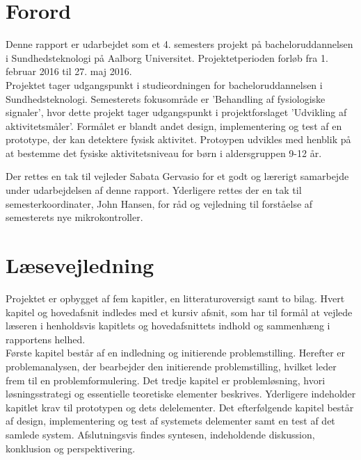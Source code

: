 \section*{Forord}
Denne rapport er udarbejdet som et 4. semesters projekt på bacheloruddannelsen i Sundhedsteknologi på Aalborg Universitet. Projektetperioden forløb fra 1. februar 2016 til 27. maj 2016. \\
Projektet tager udgangspunkt i studieordningen for bacheloruddannelsen i Sundhedsteknologi. Semesterets fokusområde er 'Behandling af fysiologiske signaler', hvor dette projekt tager udgangspunkt i projektforslaget 'Udvikling af aktivitetsmåler'. Formålet er blandt andet design, implementering og test af en prototype, der kan detektere fysisk aktivitet. Protoypen udvikles med henblik på at bestemme det fysiske aktivitetsniveau for børn i aldersgruppen 9-12 år. %

Der rettes en tak til vejleder Sabata Gervasio for et godt og lærerigt samarbejde under udarbejdelsen af denne rapport. Yderligere rettes der en tak til semesterkoordinater, John Hansen, for råd og vejledning til forståelse af semesterets nye mikrokontroller. 

\section*{Læsevejledning}
Projektet er opbygget af fem kapitler, en litteraturoversigt samt to bilag. Hvert kapitel og hovedafsnit indledes med et kursiv afsnit, som har til formål at vejlede læseren i henholdsvis kapitlets og hovedafsnittets indhold og sammenhæng i rapportens helhed.\\
Første kapitel består af en indledning og initierende problemstilling. Herefter er problemanalysen, der bearbejder den initierende problemstilling, hvilket leder frem til en problemformulering. Det tredje kapitel er problemløsning, hvori løsningsstrategi og essentielle teoretiske elementer beskrives. Yderligere indeholder kapitlet krav til prototypen og dets delelementer. Det efterfølgende kapitel består af design, implementering og test af systemets delementer samt en test af det samlede system. Afslutningsvis findes syntesen, indeholdende diskussion, konklusion og perspektivering.

